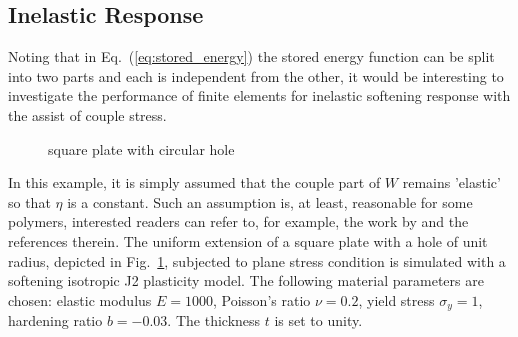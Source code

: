 \documentclass[3p,sort&compress,11pt,fleqn]{elsarticle}
\newcommand*{\figref}[1]{Fig.~\ref{#1}}
\newcommand*{\eqsref}[1]{Eq.~(\ref{#1})}
\begin{document}
\subsection{Inelastic Response}
Noting that in \eqsref{eq:stored_energy} the stored energy function can be split into two parts and each is independent from the other, it would be interesting to investigate the performance of finite elements for inelastic softening response with the assist of couple stress.

\begin{figure}[htb]
\centering\footnotesize
{}
\caption{square plate with circular hole}\label{fig:plate_with_hole}
\end{figure}
In this example, it is simply assumed that the couple part of $W$ remains 'elastic' so that $\eta$ is a constant. Such an assumption is, at least, reasonable for some polymers, interested readers can refer to, for example, the work by \citet{Alisafaei2016} and the references therein. The uniform extension of a square plate with a hole of unit radius, depicted in \figref{fig:plate_with_hole}, subjected to plane stress condition is simulated with a softening isotropic J2 plasticity model. The following material parameters are chosen: elastic modulus $E=\num{1000}$, Poisson's ratio $\nu=\num{0.2}$, yield stress $\sigma_y=\num{1}$, hardening ratio $b=\num{-0.03}$. The thickness $t$ is set to unity.
%
%
%
\end{document}
